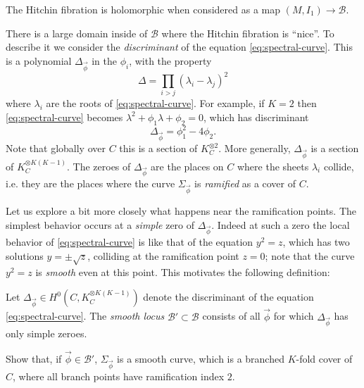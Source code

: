 \documentclass[12pt,letterpaper,reqno]{article}
\numberwithin{equation}{section}
\newcommand{\cB}{\ensuremath{\mathcal B}}
\newcommand{\ti}[1]{\textit{#1}}
\begin{document}
\begin{prop} The Hitchin fibration
is holomorphic when considered as a map $(M, I_1) \to \cB$.
\end{prop}

There is a large domain inside of $\cB$ where the Hitchin
fibration is ``nice''. To describe it we consider the \ti{discriminant}
of the equation \eqref{eq:spectral-curve}.
This is a polynomial $\Delta_{\vec\phi}$ in the $\phi_i$, 
with the property 
\begin{equation}
  \Delta = \prod_{i > j} (\lambda_i - \lambda_j)^2
\end{equation}
where $\lambda_i$ are the roots of \eqref{eq:spectral-curve}.
For example, if $K=2$
then \eqref{eq:spectral-curve} becomes 
$\lambda^2 + \phi_1 \lambda + \phi_2 = 0$, which has discriminant
\begin{equation}
  \Delta_{\vec\phi} = \phi_1^2 - 4 \phi_2.
\end{equation}
Note that globally over $C$ this is a section of $K_C^{\otimes 2}$.
More generally, $\Delta_{\vec\phi}$ is a section 
of $K_C^{\otimes K(K-1)}$.
The zeroes of $\Delta_{\vec\phi}$ are the places on $C$ where the 
sheets $\lambda_i$ collide, i.e. they are the places where
the curve $\Sigma_{\vec\phi}$ is \ti{ramified} as a cover of $C$.

Let us explore a bit more closely what happens near the ramification
points.
The simplest behavior occurs at a \ti{simple} zero of $\Delta_{\vec\phi}$.
Indeed at such a zero the local behavior of \eqref{eq:spectral-curve}
is like that of the 
equation $y^2 = z$, which has
two solutions $y = \pm \sqrt{z}$, colliding at the ramification point
$z=0$; note that the curve $y^2 = z$ is \ti{smooth} even at this point.
This motivates the following definition:

\begin{defn}
Let $\Delta_{\vec\phi} \in H^0(C, K_C^{\otimes K(K-1)})$ denote the discriminant of the 
equation \eqref{eq:spectral-curve}.
The \ti{smooth locus} $\cB' \subset \cB$ consists of all $\vec\phi$
for which $\Delta_{\vec\phi}$ has only simple zeroes.
\end{defn}

\begin{exercise} Show that, if $\vec\phi \in \cB'$,
$\Sigma_{\vec\phi}$ is a smooth curve, which is a branched $K$-fold
cover of $C$, where all branch points have ramification index $2$.
\end{exercise}
\end{document}
